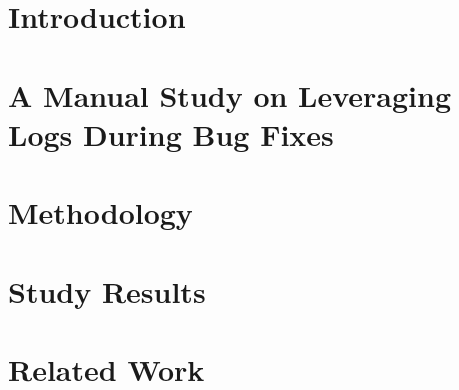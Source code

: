 \date{Received: date / Accepted: date}




\maketitle

\begin{abstract}
	
\end{abstract}





%







\section{Introduction}



\section{A Manual Study on Leveraging Logs During Bug Fixes}
\label{sec:Manual}


\section{Methodology}
\label{sec:Methodology}


\section{Study Results}
\label{sec:Study}


%




\section{Related Work}
\label{sec:Related}





